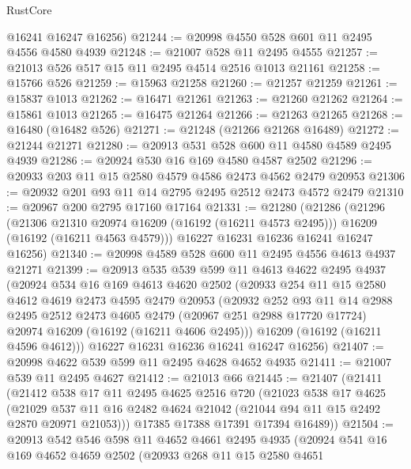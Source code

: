 \begin{lexlean}{RustCore}
\begin{coremodule}
      @16241
      @16247
      @16256)
@21244 := @20998 @4550 @528 @601 @11 @2495 @4556 @4580 @4939
@21248 := @21007 @528 @11 @2495 @4555
@21257 := @21013 @526 @517 @15 @11 @2495 @4514 @2516 @1013 @21161
@21258 := @15766 @526
@21259 := @15963 @21258
@21260 := @21257 @21259
@21261 := @15837 @1013
@21262 := @16471 @21261
@21263 := @21260 @21262
@21264 := @15861 @1013
@21265 := @16475 @21264
@21266 := @21263 @21265
@21268 := @16480 (@16482 @526)
@21271 := @21248 (@21266 @21268 @16489)
@21272 := @21244 @21271
@21280 := @20913 @531 @528 @600 @11 @4580 @4589 @2495 @4939
@21286 := @20924 @530 @16 @169 @4580 @4587 @2502
@21296 := @20933 @203 @11 @15 @2580 @4579 @4586 @2473 @4562 @2479 @20953
@21306 := @20932 @201 @93 @11 @14 @2795 @2495 @2512 @2473 @4572 @2479
@21310 := @20967 @200 @2795 @17160 @17164
@21331 := @21280
    (@21286
      (@21296
        (@21306 @21310 @20974 @16209 (@16192 (@16211 @4573 @2495)))
        @16209
        (@16192 (@16211 @4563 @4579)))
      @16227
      @16231
      @16236
      @16241
      @16247
      @16256)
@21340 := @20998 @4589 @528 @600 @11 @2495 @4556 @4613 @4937 @21271
@21399 := @20913
    @535
    @539
    @599
    @11
    @4613
    @4622
    @2495
    @4937
    (@20924
      @534
      @16
      @169
      @4613
      @4620
      @2502
      (@20933
        @254
        @11
        @15
        @2580
        @4612
        @4619
        @2473
        @4595
        @2479
        @20953
        (@20932
          @252
          @93
          @11
          @14
          @2988
          @2495
          @2512
          @2473
          @4605
          @2479
          (@20967 @251 @2988 @17720 @17724)
          @20974
          @16209
          (@16192 (@16211 @4606 @2495)))
        @16209
        (@16192 (@16211 @4596 @4612)))
      @16227
      @16231
      @16236
      @16241
      @16247
      @16256)
@21407 := @20998 @4622 @539 @599 @11 @2495 @4628 @4652 @4935
@21411 := @21007 @539 @11 @2495 @4627
@21412 := @21013 @66
@21445 := @21407
    (@21411
      (@21412
        @538
        @17
        @11
        @2495
        @4625
        @2516
        @720
        (@21023
          @538
          @17
          @4625
          (@21029 @537 @11 @16 @2482 @4624 @21042 (@21044 @94 @11 @15 @2492 @2870 @20971 @21053)))
        @17385
        @17388
        @17391
        @17394
        @16489))
@21504 := @20913
    @542
    @546
    @598
    @11
    @4652
    @4661
    @2495
    @4935
    (@20924
      @541
      @16
      @169
      @4652
      @4659
      @2502
      (@20933
        @268
        @11
        @15
        @2580
        @4651

\end{coremodule}
\end{lexlean}
